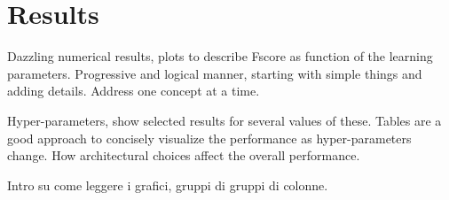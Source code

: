 
\section{Results}
\label{sec:results}

Dazzling numerical results, plots to describe Fscore as function of the learning parameters.
Progressive and logical manner, starting with simple things and adding details.
Address one concept at a time.

Hyper-parameters, show selected results for several values of these.
Tables are a good approach to concisely visualize the performance as hyper-parameters change.
How architectural choices affect the overall performance.

Intro su come leggere i grafici, gruppi di gruppi di colonne.
